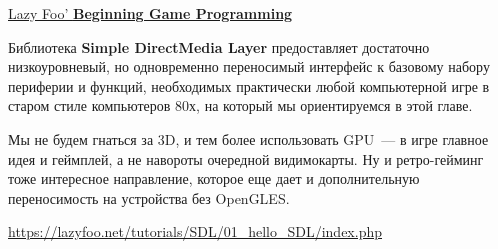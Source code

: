 \clearpage
{}\secdown

\href{https://lazyfoo.net/tutorials/SDL/index.php}{Lazy Foo' \textbf{Beginning Game Programming}}

\bigskip\noindent Библиотека \textbf{Simple DirectMedia Layer} предоставляет
достаточно низкоуровневый, но одновременно переносимый интерфейс к базовому
набору периферии и функций, необходимых практически любой компьютерной игре в
старом стиле компьютеров 80х, на который мы ориентируемся в этой главе.

Мы не будем гнаться за 3D, и тем более использовать GPU\ --- в игре главное идея
и геймплей, а не навороты очередной видимокарты. Ну и ретро-гейминг
\cite{zxgame} тоже интересное направление, которое еще дает и дополнительную
переносимость на устройства без OpenGLES.

\clearpage
{}

\url{https://lazyfoo.net/tutorials/SDL/01_hello_SDL/index.php}

\secup
